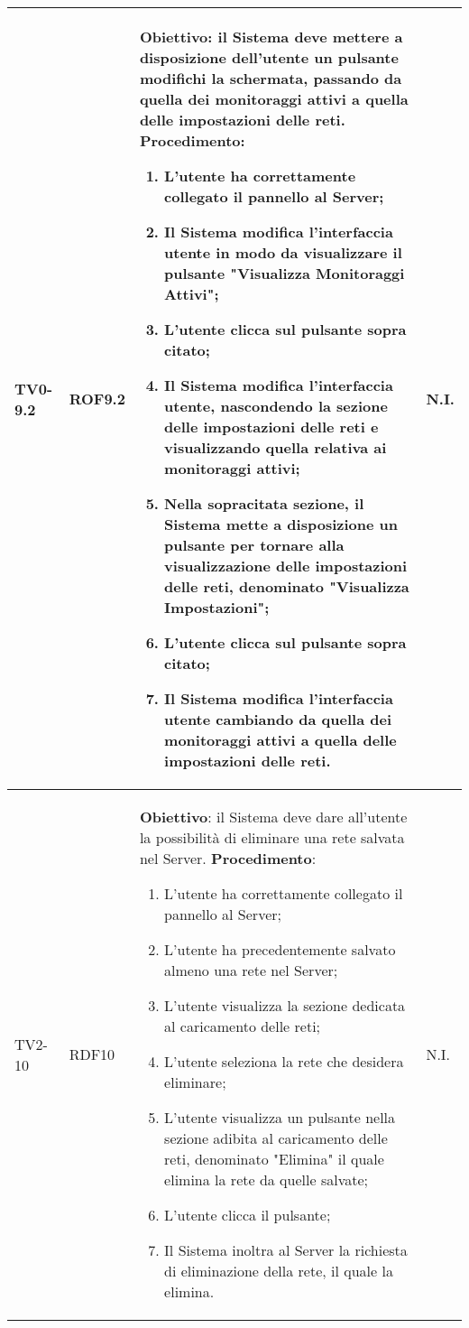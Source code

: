 \begin{longtable}{|C{.15\textwidth}|C{.13\textwidth}|m{.65\textwidth}|C{.08\textwidth}|}
TV0-9.2 & ROF9.2 &
	\textbf{Obiettivo}: il Sistema deve mettere a disposizione dell'utente un pulsante modifichi la schermata, passando da quella dei monitoraggi attivi a quella delle impostazioni delle reti. \newline
	\textbf{Procedimento}:
	\begin{enumerate}
		\item L'utente ha correttamente collegato il pannello al Server;
		\item Il Sistema modifica l'interfaccia utente in modo da visualizzare il pulsante "Visualizza Monitoraggi Attivi";
		\item L'utente clicca sul pulsante sopra citato;
		\item Il Sistema modifica l'interfaccia utente, nascondendo la sezione delle impostazioni delle reti e visualizzando quella relativa ai monitoraggi attivi;
		\item Nella sopracitata sezione, il Sistema mette a disposizione un pulsante per tornare alla visualizzazione delle impostazioni delle reti, denominato "Visualizza Impostazioni";
		\item L'utente clicca sul pulsante sopra citato;
		\item Il Sistema modifica l'interfaccia utente cambiando da quella dei monitoraggi attivi a quella delle impostazioni delle reti.
	\end{enumerate}
	& N.I. \\
\hline

TV2-10 & RDF10 &
	\textbf{Obiettivo}: il Sistema deve dare all'utente la possibilità di eliminare una rete salvata nel Server. \newline
	\textbf{Procedimento}:
	\begin{enumerate}
		\item L'utente ha correttamente collegato il pannello al Server;
		\item L'utente ha precedentemente salvato almeno una rete nel Server;
		\item L'utente visualizza la sezione dedicata al caricamento delle reti;
		\item L'utente seleziona la rete che desidera eliminare;
		\item L'utente visualizza un pulsante nella sezione adibita al caricamento delle reti, denominato "Elimina" il quale elimina la rete da quelle salvate;
		\item L'utente clicca il pulsante;
		\item Il Sistema inoltra al Server la richiesta di eliminazione della rete, il quale la elimina.
	\end{enumerate}
	& N.I. \\
\hline



\end{longtable}
